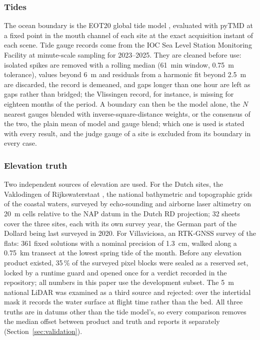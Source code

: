 \documentclass[final,5p,times,number]{elsarticle}
\begin{document}
\subsubsection{Tides}

The ocean boundary is the EOT20 global tide model \citep{hartdavis2021},
evaluated with pyTMD \citep{sutterley2025} at a fixed point in the mouth
channel of each site at the exact acquisition instant of each scene. Tide
gauge records come from the IOC Sea Level Station Monitoring Facility
\citep{ioc2026} at minute-scale sampling for 2023--2025. They are cleaned
before use: isolated spikes are removed with a rolling median (61~min
window, 0.75~m tolerance), values beyond 6~m and residuals from a
harmonic fit beyond 2.5~m are discarded, the record is demeaned, and gaps
longer than one hour are left as gaps rather than bridged; the Vlissingen
record, for instance, is missing for eighteen months of the period. A
boundary can then be the model alone, the $N$ nearest gauges blended with
inverse-square-distance weights, or the consensus of the two, the plain
mean of model and gauge blend; which one is used is stated with every
result, and the judge gauge of a site is excluded from its boundary in
every case.

\subsubsection{Elevation truth}

Two independent sources of elevation are used. For the Dutch sites, the
Vaklodingen of Rijkswaterstaat \citep{rws_vaklodingen}, the national
bathymetric and topographic grids of the coastal waters, surveyed by
echo-sounding and airborne laser altimetry on 20~m cells relative to the
NAP datum in the Dutch RD projection; 32 sheets cover the three sites,
each with its own survey year, the German part of the Dollard being last
surveyed in 2020. For Villaviciosa, an RTK-GNSS survey of the flats: 361
fixed solutions with a nominal precision of 1.3~cm, walked along a
0.75~km transect at the lowest spring tide of the month. Before any
elevation product existed, 35\,\% of the surveyed pixel blocks were
sealed as a reserved set, locked by a runtime guard and opened once for a
verdict recorded in the repository; all numbers in this paper use the
development subset. The 5~m national LiDAR was examined as a third source
and rejected: over the intertidal mask it records the water surface at
flight time rather than the bed. All three truths are in datums other
than the tide model's, so every comparison removes the median offset
between product and truth and reports it separately
(Section~\ref{sec:validation}).
\end{document}
